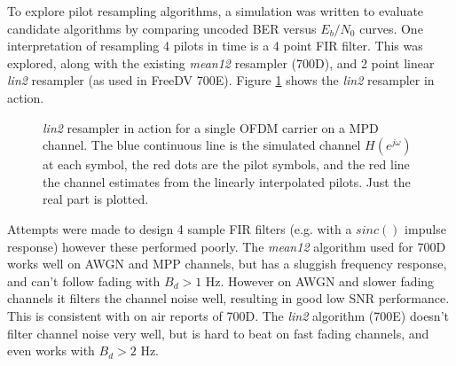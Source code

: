 \documentclass{article}
\begin{document}
To explore pilot resampling algorithms, a simulation was written to evaluate candidate algorithms by comparing uncoded BER versus $E_b/N_0$ curves.  One interpretation of resampling 4 pilots in time is a 4 point FIR filter. This was explored, along with the existing \emph{mean12} resampler (700D), and 2 point linear \emph{lin2} resampler (as used in FreeDV 700E). Figure \ref{fig:interpolator} shows the \emph{lin2} resampler in action.

\begin{figure}[h]
\caption{\emph{lin2} resampler in action for a single OFDM carrier on a MPD channel. The blue continuous line is the simulated channel $H(e^{j \omega})$ at each symbol, the red dots are the pilot symbols, and the red line the channel estimates from the linearly interpolated pilots.  Just the real part is plotted.}
\label{fig:interpolator}
\begin{center}

\end{center}
\end{figure}

Attempts were made to design 4 sample FIR filters (e.g. with a $sinc()$ impulse response) however these performed poorly. The \emph{mean12} algorithm used for 700D works well on AWGN and MPP channels, but has a sluggish frequency response, and can't follow fading with $B_d>1$ Hz.  However on AWGN and slower fading channels it filters the channel noise well, resulting in good low SNR performance.  This is consistent with on air reports of 700D. The \emph{lin2} algorithm (700E) doesn't filter channel noise very well, but is hard to beat on fast fading channels, and even works with $B_d>2$ Hz.
\end{document}
